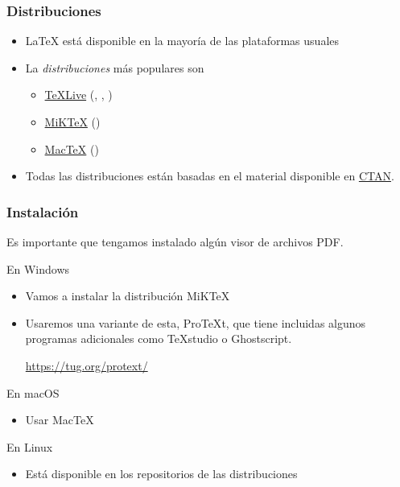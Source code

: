 \documentclass[10pt,xcolor=svgnames]{beamer}
\begin{document}
\begin{frame}
  \frametitle{Distribuciones}
  \begin{itemize}
    \item \LaTeX{} está disponible en la mayoría de las plataformas usuales

    \item La \emph{distribuciones} más populares son
    \medskip

    \begin{itemize}
      \item \href{https://tug.org/texlive/}{\TeX Live} (\faApple, \faLinux, \faWindows)
      \item \href{https://miktex.org/}{MiK\TeX{}} (\faWindows)
      \item \href{https://www.tug.org/mactex/}{Mac\TeX{}} (\faApple)
    \end{itemize}

  \item Todas las distribuciones están basadas en el material disponible en \href{https://www.ctan.org/}{CTAN}.	
\end{itemize}
\end{frame}


\begin{frame}
  \frametitle{Instalación}

  Es importante que tengamos instalado algún visor de archivos PDF.

  \begin{block}{En Windows \faWindows}
    \begin{itemize}
      \item Vamos a instalar la distribución MiK\TeX
      \item Usaremos una variante de esta, \alert{Pro\TeX{t}}, que tiene incluidas algunos programas adicionales como TeXstudio o Ghostscript. 

        \centerline{\small \url{https://tug.org/protext/}}

    \end{itemize}
  \end{block}


  \begin{block}{En macOS \faApple}
    \begin{itemize}
      \item Usar \alert{Mac\TeX{}}  
    \end{itemize}
  \end{block}

  \begin{block}{En Linux \faLinux}
    \begin{itemize}
      \item Está disponible en los repositorios de las distribuciones
    \end{itemize}
  \end{block}
\end{frame}
\end{document}
